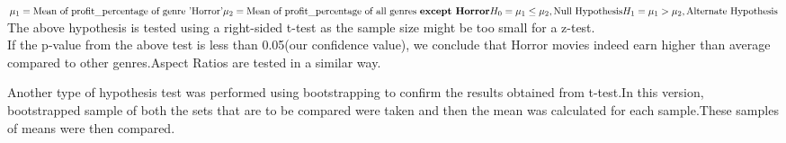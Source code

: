 \documentclass{beamer}
\begin{document}
\begin{frame}
\begin{tcolorbox}[colback=purple!5,colframe=blue!75!black,title=Example of a Hypothesis]
	\begin{math}
	 \mu_1  = \text{Mean of profit\_percentage of genre 'Horror'} \\
	 \mu_2  = \text{Mean of profit\_percentage of all genres \textbf{except Horror}}\\
		H_0   =  \mu_1\leq\mu_2 , \text{Null Hypothesis} \\ 
		H_1   =  \mu_1>\mu_2 , \text{Alternate Hypothesis} \\
	\end{math}
	 \tcblower
	 The above hypothesis is tested using a right-sided t-test as the 
	 sample size might be too small for a z-test.\\
	 If the p-value from the above test
	 is less than 0.05(our confidence value), we conclude that Horror movies indeed
	 earn higher than average compared to other genres.Aspect Ratios are tested in a similar
	 way.

\end{tcolorbox} 



\end{frame}
\begin{frame}

\begin{tcolorbox}[colback=purple!5,colframe=blue!75!black,title=Bootstrapped Hypothesis Testing]
Another type of hypothesis test was performed using bootstrapping to confirm the results obtained from t-test.In this version, bootstrapped sample of both the sets that are to be compared were taken and then the mean was calculated for each sample.These samples of means were then compared. 
\end{tcolorbox}	
\end{frame}
\end{document}
